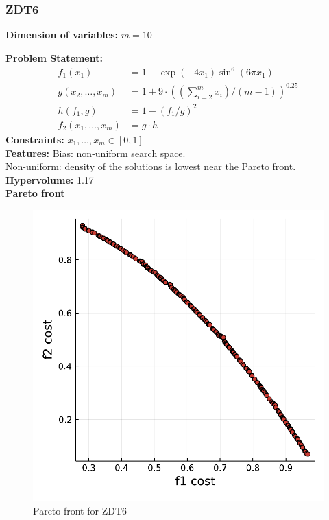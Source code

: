 \documentclass[11pt,oneside,onecolumn,openright]{article}
\begin{document}
   
   \subsubsection{ZDT6~\cite{huband2006review}}
    \textbf{Dimension of variables: }$m=10$

  \noindent\textbf{Problem Statement: }
  \begin{equation}
  \begin{aligned}
  f_{1}\left(x_{1}\right) & =1-\exp \left(-4 x_{1}\right) \sin ^{6}\left(6 \pi x_{1}\right) \\
  g\left(x_{2}, \ldots, x_{m}\right) & =1+9 \cdot\left(\left(\sum_{i=2}^{m} x_{i}\right) /(m-1)\right)^{0.25} \\
  h\left(f_{1}, g\right) & =1-\left(f_{1} / g\right)^{2}\\
  f_2(x_{1}, \ldots, x_{m})&=g\cdot h
  \end{aligned}
  \end{equation}
  \noindent\textbf{Constraints: } $x_{1}, \ldots, x_{m} \in[0,1]$\\
  \noindent\textbf{Features: } Bias: non-uniform search space. \\
  \noindent Non-uniform: density of the solutions is lowest near the Pareto front.\\
  \noindent\textbf{Hypervolume: } 1.17\\
  \noindent\textbf{Pareto front}
      \begin{figure}[H]
      \centering
      \includegraphics[width=12cm]{fig/nuni1.pdf}
      \cprotect\caption{Pareto front for ZDT6}
      \end{figure}
\end{document}
